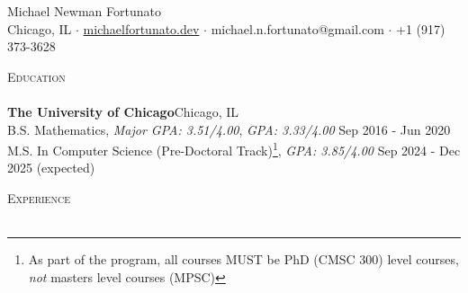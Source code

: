 \documentclass[a4paper]{article}
\newcommand{\lineunder} {
    \vspace*{-8pt} \\
    \hspace*{-18pt} \hrulefill \\
}
\newcommand{\header} [1] {
    {\hspace*{-18pt}\vspace*{6pt} \textsc{#1}}
    \vspace*{-6pt} \lineunder
}
\begin{document}
\vspace*{-40pt}



\vspace*{-10pt}
\begin{center}
	{\Huge {Michael Newman Fortunato}}\\
	Chicago, IL $\cdot$ \href{https://www.michaelfortunato.dev}{michaelfortunato.dev} $\cdot$  michael.n.fortunato@gmail.com $\cdot$ +1 (917) 373-3628 \end{center}

\header{Education}
\textbf{The University of Chicago}\hfill Chicago, IL\\
B.S. Mathematics, \textit{Major GPA: 3.51/4.00}, \textit{GPA: 3.33/4.00} \hfill Sep 2016 - Jun 2020\\
M.S. In Computer Science (Pre-Doctoral Track)\footnote{As part of the program, all courses MUST be PhD (CMSC 300) level courses, \textit{not} masters level courses (MPSC)}, \textit{GPA: 3.85/4.00} \hfill Sep 2024 - Dec 2025 (expected)\\
\vspace{2mm}

\header{Experience}
\vspace{1mm}
\end{document}
